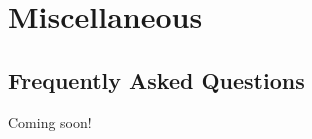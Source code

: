 \documentclass[letterpaper,10pt,english]{sphinxmanual}
\begin{document}
\chapter{Miscellaneous}
\label{\detokenize{index:miscellaneous}}
\sphinxstepscope


\section{Frequently Asked Questions}
\label{\detokenize{faq/index:frequently-asked-questions}}\label{\detokenize{faq/index:faq}}\label{\detokenize{faq/index::doc}}
\sphinxAtStartPar
Coming soon!



\renewcommand{\indexname}{Index}
\printindex
\end{document}
